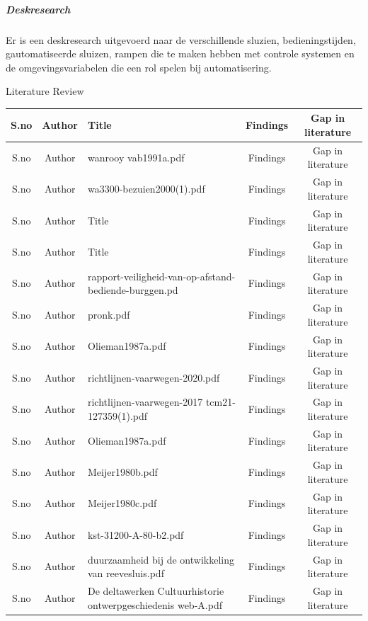\subparagraph{Deskresearch}
Er is een deskresearch uitgevoerd naar de verschillende sluzien, bedieningstijden, gautomatiseerde sluizen, rampen die te maken hebben met controle systemen en de omgevingsvariabelen die een rol spelen bij automatisering.




\begin{frame}{Literature Review}
	\begin{table}[htbp]
		\footnotesize
		
		\centering
		\begin{tabular}{|c|c|p{2in}|c|c|}\hline
			S.no&Author&Title&Findings&Gap in literature\\\hline
			S.no&Author&wanrooy \textunderscore vab1991a.pdf&Findings&Gap in literature\\\hline
			S.no&Author&wa3300-bezuien2000(1).pdf&Findings&Gap in literature\\\hline
			S.no&Author&Title&Findings&Gap in literature\\\hline
			S.no&Author&Title&Findings&Gap in literature\\\hline
			S.no&Author&rapport-veiligheid-van-op-afstand-bediende-burggen.pd&Findings&Gap in literature\\\hline
			S.no&Author&pronk.pdf&Findings&Gap in literature\\\hline
			S.no&Author&Olieman1987a.pdf&Findings&Gap in literature\\\hline
			S.no&Author&richtlijnen-vaarwegen-2020.pdf&Findings&Gap in literature\\\hline
			S.no&Author&richtlijnen-vaarwegen-2017 \textunderscore tcm21-127359(1).pdf&Findings&Gap in literature\\\hline
			S.no&Author&Olieman1987a.pdf&Findings&Gap in literature\\\hline
			S.no&Author&Meijer1980b.pdf&Findings&Gap in literature\\\hline
			S.no&Author&Meijer1980c.pdf&Findings&Gap in literature\\\hline
			S.no&Author&kst-31200-A-80-b2.pdf&Findings&Gap in literature\\\hline
			S.no&Author&duurzaamheid \textunderscore bij \textunderscore de \textunderscore ontwikkeling \textunderscore van \textunderscore reevesluis.pdf&Findings&Gap in literature\\\hline
			S.no&Author&De \textunderscore deltawerken \textunderscore Cultuurhistorie \textunderscore ontwerpgeschiedenis \textunderscore web-A.pdf&Findings&Gap in literature\\\hline

\end{tabular}
\end{table}
\end{frame}
